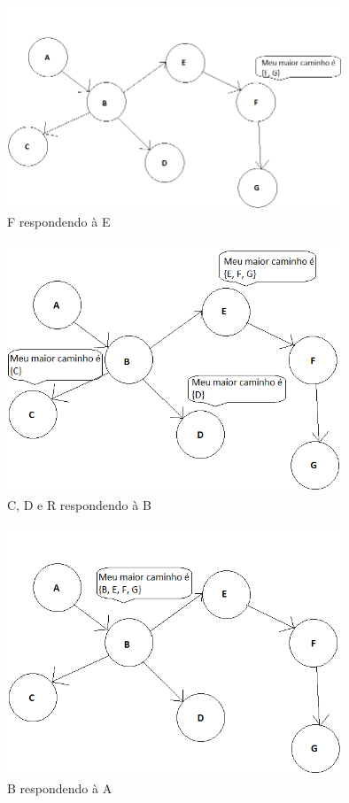 \documentclass[12pt]{article}
\begin{document}
\begin{figure}[H]
\centering
\includegraphics[width=100mm]{graphFr.png}
\caption{F respondendo à E}
\label{graphFr}
\end{figure}

\begin{figure}[H]
\centering
\includegraphics[width=100mm]{graphCrDrEr.png}
\caption{C, D e R respondendo à B}
\label{graphCrDrE}
\end{figure}

\begin{figure}[H]
\centering
\includegraphics[width=100mm]{graphBr.png}
\caption{B respondendo à A}
\label{graphBr}
\end{figure}
\end{document}
